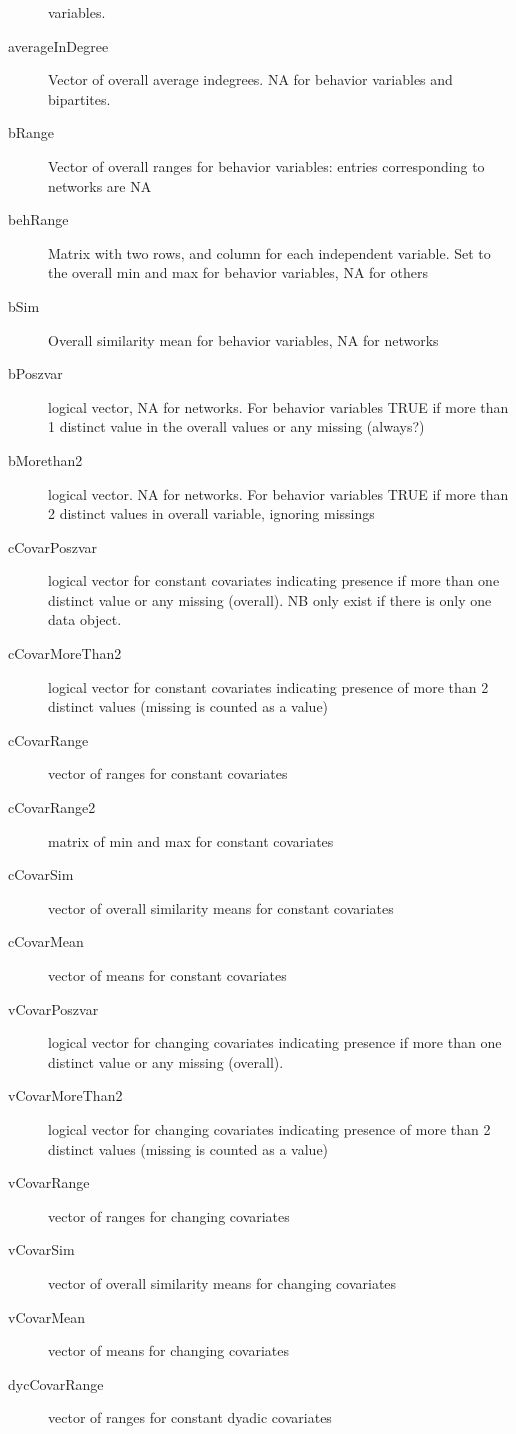 \documentclass[12pt,a4paper]{article}
\renewcommand{\=}{\,=\,}
\newcommand{\+}{\,+\,}
\begin{document}
\begin{description}
  variables.
\item[averageInDegree] Vector of overall average indegrees. NA for behavior
  variables and bipartites.
\item[bRange] Vector of overall ranges for behavior variables: entries
  corresponding to networks are NA
\item[behRange] Matrix with two rows, and column for each independent
  variable. Set to the overall min and max for behavior variables, NA for others
\item[bSim] Overall similarity mean for behavior variables, NA for networks
\item[bPoszvar] logical vector, NA for networks. For behavior variables TRUE if
  more than 1 distinct value in the overall values or any missing (always?)
\item[bMorethan2] logical vector. NA for networks. For behavior variables
  TRUE if more than 2 distinct values in overall variable, ignoring missings
\item[cCovarPoszvar] logical vector for constant covariates indicating presence
  if more than one distinct value or any missing (overall). NB only exist if
  there is only one data object.
\item[cCovarMoreThan2] logical vector for constant covariates indicating
  presence of more than 2 distinct values (missing is counted as a value)
\item[cCovarRange] vector of ranges for constant covariates
\item[cCovarRange2] matrix of min and max for constant covariates
\item[cCovarSim] vector of overall similarity means for constant covariates
\item[cCovarMean] vector of means for constant covariates
\item[vCovarPoszvar] logical vector for changing covariates indicating presence
  if more than one distinct value or any missing (overall).
\item[vCovarMoreThan2] logical vector for changing covariates indicating
  presence of more than 2 distinct values (missing is counted as a value)
\item[vCovarRange] vector of ranges for changing covariates
\item[vCovarSim] vector of overall similarity means for changing covariates
\item[vCovarMean] vector of means for changing covariates
\item[dycCovarRange] vector of ranges for constant dyadic covariates

\end{description}
\end{document}
